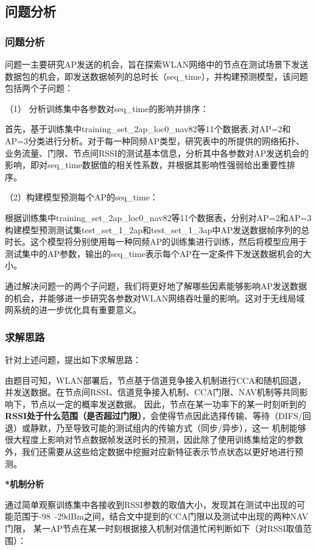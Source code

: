 \documentclass[bwprint]{gmcmthesis}
\begin{document}
\subsection{问题分析}
\subsubsection{问题分析}
问题一主要研究AP发送的机会，旨在探索WLAN网络中的节点在测试场景下发送数据包的机会，即发送数据帧列的总时长（seq\_time），并构建预测模型，该问题包括两个子问题：

（1） 分析训练集中各参数对seq\_time的影响并排序：

首先，基于训练集中training\_set\_2ap\_loc0\_nav82等11个数据表,对AP=2和AP=3分类进行分析。对于每一种同频AP类型，研究表中的所提供的网络拓扑、业务流量、门限、节点间RSSI的测试基本信息，分析其中各参数对AP发送机会的影响，即对seq\_time数据值的相关性系数，并根据其影响性强弱给出重要性排序。

（2）构建模型预测每个AP的seq\_time：

根据训练集中training\_set\_2ap\_loc0\_nav82等11个数据表，分别对AP=2和AP=3构建模型预测测试集test\_set\_1\_2ap和test\_set\_1\_3ap中AP发送数据帧序列的总时长。这个模型将分别使用每一种同频AP的训练集进行训练，然后将模型应用于测试集中的AP参数，输出的seq\_time表示每个AP在一定条件下发送数据机会的大小。 

通过解决问题一的两个子问题，我们将更好地了解哪些因素能够影响AP发送数据的机会，并能够进一步研究各参数对WLAN网络吞吐量的影响。这对于无线局域网系统的进一步优化具有重要意义。

\subsubsection{求解思路}
针对上述问题，提出如下求解思路：

由题目可知，WLAN部署后，节点基于信道竞争接入机制进行CCA和随机回退，并发送数据。在节点间RSSI、信道竞争接入机制、CCA门限、NAV机制等共同影响下，节点以一定的概率发送数据。
因此，节点在某一功率下的某一时刻听到的\textbf{RSSI处于什么范围（是否超过门限）}，会使得节点因此选择传输、等待（DIFS/回退）或静默，乃至导致可能的测试组内的传输方式（同步/异步），这一
机制能够很大程度上影响对节点数据帧发送时长的预测，因此除了使用训练集给定的参数外，我们还需要从这些给定数据中挖掘对应新特征表示节点状态以更好地进行预测。

\textbf{*机制分析}

通过简单观察训练集中各接收到RSSI参数的取值大小，发现其在测试中出现的可能范围于-98~-29dBm之间，结合文中提到的CCA门限以及测试中出现的两种NAV门限，
某一AP节点在某一时刻根据接入机制对信道忙闲判断如下（对RSSI取值范围）：
\end{document}

